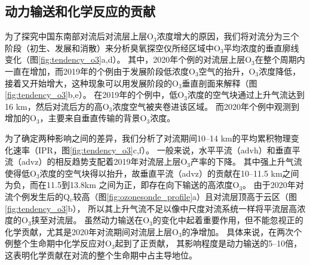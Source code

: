 \subsection{动力输送和化学反应的贡献} \label{sec:convec_impacts}

为了探究中国东南部对流后对流层上层O$_3$浓度增大的原因，我们将对流分为三个阶段（初生、发展和消散）来分析臭氧探空仪所经区域中O$_3$平均浓度的垂直廓线变化（图\ref{fig:tendency_o3}a,d）。
其中，2020年个例的对流层上层O$_3$在整个周期内一直在增加，而2019年的个例由于发展阶段低浓度O$_3$空气的抬升，O$_3$浓度降低，接着又开始增大，这种现象可以用发展阶段的O$_3$垂直剖面来解释（图\ref{fig:tendency_o3}b,e）。
在2019年的个例中，低O$_3$浓度的空气块通过上升气流达到16 km，然后对流后方的高O$_3$浓度空气被夹卷进该区域。
而2020年个例中观测到增加的O$_3$，主要来自垂直传输的背景O$_3$浓度。

为了确定两种影响之间的差异，我们分析了对流期间10--14 km的平均累积物理变化速率（IPR，图\ref{fig:tendency_o3}c,f）。
一般来说，水平平流（advh）和垂直平流（advz）的相反趋势支配着2019年对流层上层O$_3$产率的下降。
其中强上升气流使得低O$_3$浓度的空气块得以抬升，故垂直平流（advz）的贡献在10--11.5 km之间为负，而在11.5到13.8km 之间为正，即存在向下输送的高浓度O$_3$。
由于2020年对流个例发生后的Q$_v$较高（图\ref{fig:ozonesonde_profile}a）且对流层顶高于云区（图\ref{fig:tendency_o3}b），
所以其上升气流不足以像中尺度对流系统一样将平流层高浓度的O$_3$挟至对流层\citep{Phoenix.2020}。
虽然动力输送在O$_3$的变化中起着重要作用，但不能忽视正的化学贡献，尤其是2020年对流期间对流层上层O$_3$的净增加。
具体来说，在两次个例整个生命期中化学反应对O$_3$起到了正贡献，
其影响程度是动力输送的5--10倍，这表明化学贡献在对流的整个生命期中占主导地位。


